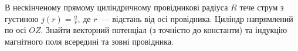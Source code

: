 \begin{problem}
В нескінченому прямому циліндричному провідникові радіуса $R$ тече струм з густиною $j(r) = \frac{a}{r}$, де $r$~--- відстань від осі провідника. Циліндр напрямлений по осі $OZ$. Знайти векторний потенціал (з точністю до константи) та індукцію магнітного поля всередині та зовні провідника.
\end{problem}



